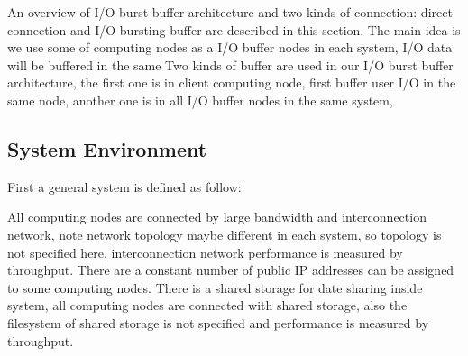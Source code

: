 \documentclass[JIP,draft]{ipsj}
\begin{document}

An overview of I/O burst buffer architecture and two kinds of connection: direct connection and I/O bursting buffer are described in this section.
The main idea is we use some of computing nodes as a I/O buffer nodes in each system, I/O data will be buffered in the same 
Two kinds of buffer are used in our I/O burst buffer architecture, the first one is in client computing node, first buffer user I/O in the same node, another one is in all I/O buffer nodes in the same system,




\subsection{System Environment}
First a general system is defined as follow:

All computing nodes are connected by large bandwidth and interconnection network, note network topology maybe different in each system, so topology is not specified here, interconnection network performance is measured by throughput.
There are a constant number of public IP addresses can be assigned to some computing nodes.
There is a shared storage for date sharing inside system, all computing nodes are connected with shared storage, also the filesystem of shared storage is not specified and performance is measured by throughput.
\end{document}
